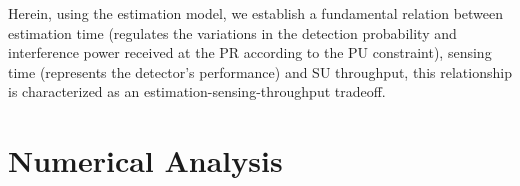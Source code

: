 \begin{remark} \label{co:coro1} 
\normalfont
Herein, using the estimation model, we establish a fundamental relation between estimation time (regulates the variations in the detection probability and interference power received at the PR according to the PU constraint), sensing time (represents the detector's performance) and SU throughput, this relationship is characterized as an estimation-sensing-throughput tradeoff.
\end{remark} 
\section{Numerical Analysis} \label{sec:num_ana}

